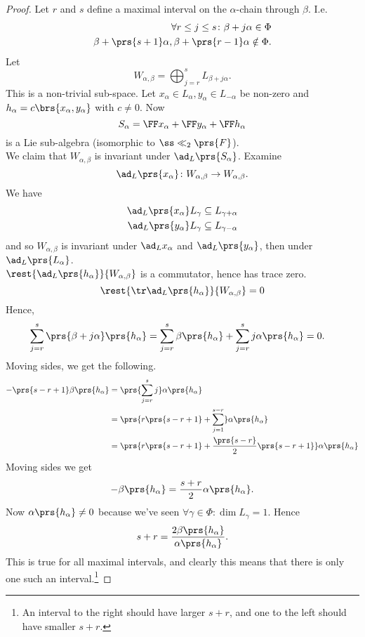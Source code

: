 \documentclass[10pt,a4paper,twoside,openany,hidelinks]{book}
\begin{document}
\begin{proof}
Let $r$ and $s$ define a maximal interval on the $\alpha$-chain through $\beta$. I.e.
\begin{align*}
\forall r \leq j \leq s \colon \beta + j\alpha \in \Phi \\
\beta + \prs{s+1} \alpha, \beta + \prs{r-1}\alpha \notin \Phi \text{.}
\end{align*}
Let
\[W_{\alpha,\beta} = \bigoplus_{j = r}^s L_{\beta + j\alpha} \text{.}\]
This is a non-trivial sub-space.
Let $x_{\alpha} \in L_{\alpha}, y_{\alpha} \in L_{-\alpha}$ be non-zero and $h_{\alpha} = c\brs{x_{\alpha}, y_{\alpha}}$ with $c \neq 0$.
Now \[S_{\alpha} = \FF x_{\alpha} + \FF y_{\alpha} + \FF h_{\alpha}\]
is a Lie sub-algebra (isomorphic to $\ss\ll_2\prs{F}$).\\
We claim that $W_{\alpha,\beta}$ is invariant under $\ad_L \prs{S_{\alpha}}$. Examine
\[\ad_L\prs{x_{\alpha}} \colon W_{\alpha,\beta} \to W_{\alpha,\beta} \text{.}\]
We have
\begin{align*}
\ad_L\prs{x_{\alpha}}L_{\gamma} \subseteq L_{\gamma + \alpha} \\
\ad_L\prs{y_{\alpha}} L_{\gamma} \subseteq L_{\gamma - \alpha}
\end{align*}
and so $W_{\alpha,\beta}$ is invariant under $\ad_L x_{\alpha}$ and $\ad_L\prs{y_{\alpha}}$, then under $\ad_L\prs{L_{\alpha}}$.\\
$\rest{\ad_L\prs{h_{\alpha}}}{W_{\alpha,\beta}}$ is a commutator, hence has trace zero.
\[\rest{\tr \ad_L\prs{h_{\alpha}}}{W_{\alpha,\beta}} = 0\]
Hence,
\begin{align*}
\sum_{j=r}^s \prs{\beta + j\alpha}\prs{h_{\alpha}} &= \sum_{j=r}^s \beta\prs{h_{\alpha}} + \sum_{j=r}^s j\alpha\prs{h_{\alpha}} = 0 \text{.}
\end{align*}
Moving sides, we get the following.
\begin{align*}
-\prs{s-r+1}\beta\prs{h_{\alpha}} &= \prs{\sum_{j=r}^s j} \alpha\prs{h_{\alpha}} \\&=
\prs{r \prs{s-r+1} + \sum_{j=1}^{s-r}} \alpha\prs{h_{\alpha}} \\&=
\prs{r \prs{s-r+1} + \frac{\prs{s-r}}{2}\prs{s-r+1}} \alpha\prs{h_{\alpha}}
\end{align*}
Moving sides we get
\[-\beta\prs{h_{\alpha}} = \frac{s+r}{2} \alpha\prs{h_{\alpha}} \text{.}\]
Now $\alpha\prs{h_{\alpha}} \neq 0$ because we've seen $\forall \gamma \in \Phi \colon \dim L_{\gamma} = 1$. Hence \[s+r = \frac{2\beta\prs{h_{\alpha}}}{\alpha\prs{h_{\alpha}}}\text{.}\]
This is true for all maximal intervals, and clearly this means that there is only one such an interval.\footnote{An interval to the right should have larger $s+r$, and one to the left should have smaller $s+r$.}
\end{proof}
\end{document}
